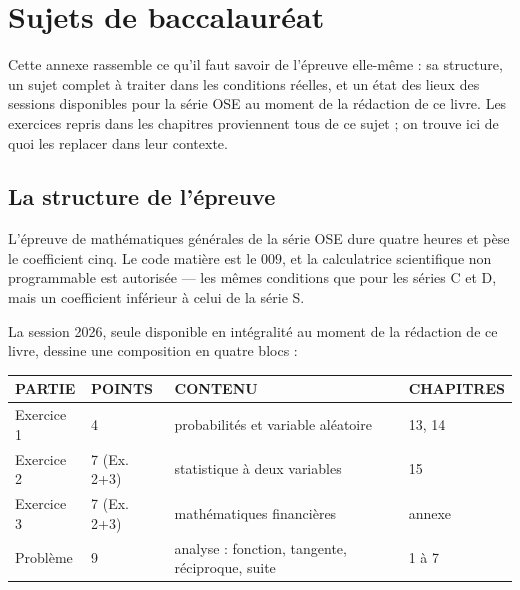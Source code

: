 \chapter{Sujets de baccalauréat}

Cette annexe rassemble ce qu'il faut savoir de l'épreuve elle-même : sa
structure, un sujet complet à traiter dans les conditions réelles, et un
état des lieux des sessions disponibles pour la série OSE au moment de la
rédaction de ce livre. Les exercices repris dans les chapitres proviennent
tous de ce sujet ; on trouve ici de quoi les replacer dans leur contexte.

\section*{La structure de l'épreuve}

L'épreuve de mathématiques générales de la série OSE dure quatre heures et
pèse le coefficient cinq. Le code matière est le $009$, et la calculatrice
scientifique non programmable est autorisée — les mêmes conditions que pour
les séries C et D, mais un coefficient inférieur à celui de la série S.

La session 2026, seule disponible en intégralité au moment de la rédaction
de ce livre, dessine une composition en quatre blocs :

\begin{center}
\setlength{\tabcolsep}{6pt}
\renewcommand{\arraystretch}{1.35}
\begin{tabular}{@{}L{1.8cm}L{1.3cm}L{5.8cm}L{2.4cm}@{}}
\toprule
\textsf{\footnotesize\bfseries PARTIE} &
\textsf{\footnotesize\bfseries POINTS} &
\textsf{\footnotesize\bfseries CONTENU} &
\textsf{\footnotesize\bfseries CHAPITRES} \\
\midrule
Exercice 1 & 4 & probabilités et variable aléatoire & 13, 14 \\
Exercice 2 & 7 (Ex. 2+3) & statistique à deux variables & 15 \\
Exercice 3 & 7 (Ex. 2+3) & mathématiques financières & annexe \\
Problème & 9 & analyse : fonction, tangente, réciproque, suite & 1 à 7 \\
\bottomrule
\end{tabular}
\end{center}

